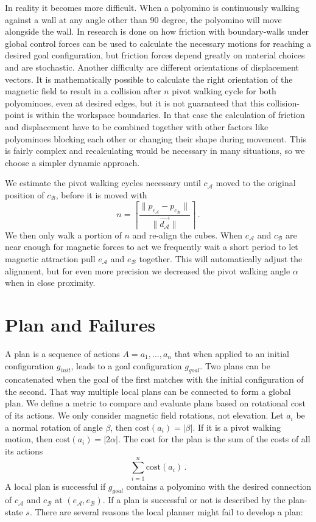 In reality it becomes more difficult.
When a polyomino is continuously walking against a wall at any angle other than 90 degree, the polyomino will move alongside the wall.
In \cite{schmidt2020} research is done on how friction with boundary-walls under global control forces can be used to calculate the necessary motions for reaching a desired goal configuration, but friction forces depend greatly on material choices and are stochastic.
Another difficulty are different orientations of displacement vectors.
It is mathematically possible to calculate the right orientation of the magnetic field to result in a collision after $n$ pivot walking cycle for both polyominoes, even at desired edges, but it is not guaranteed that this collision-point is within the workspace boundaries.
In that case the calculation of friction and displacement have to be combined together with other factors like polyominoes blocking each other or changing their shape during movement.
This is fairly complex and recalculating would be necessary in many situations, so we choose a simpler dynamic approach.

We estimate the pivot walking cycles necessary until $c_\mathcal{A}$ moved to the original position of $c_\mathcal{B}$, before it is moved with
\begin{equation}
n = \left\lceil \frac{\lVert p_{c_\mathcal{A}} - p_{c_\mathcal{B}}\rVert}{\lVert \vec{d_\mathcal{A}} \rVert} \right\rceil \,.
\end{equation}
We then only walk a portion of $n$ and re-align the cubes.
When $c_\mathcal{A}$ and $c_\mathcal{B}$ are near enough for magnetic forces to act we frequently wait a short period to let magnetic attraction pull $e_\mathcal{A}$ and $e_\mathcal{B}$ together.
This will automatically adjust the alignment, but for even more precision we decreased the pivot walking angle $\alpha$ when in close proximity.

\section{Plan and Failures}
\label{sec:plan}

A plan is a sequence of actions $A = a_1, ... , a_n$ that when applied to an initial configuration $g_{init}$, leads to a goal configuration $g_{goal}$.
Two plans can be concatenated when the goal of the first matches with the initial configuration of the second.
That way multiple local plans can be connected to form a global plan.
We define a metric to compare and evaluate plans based on rotational cost of its actions.
We only consider magnetic field rotations, not elevation.
Let $a_i$ be a normal rotation of angle $\beta$, then $\text{cost}(a_i) = |\beta|$.
If it is a pivot walking motion, then $\text{cost}(a_i) = |2\alpha|$.
The cost for the plan is the sum of the costs of all its actions
\begin{equation}
\sum_{i=1}^{n} \text{cost}(a_i) \,.
\end{equation}
A local plan is successful if $g_{goal}$ contains a polyomino with the desired connection of $c_\mathcal{A}$ and $c_\mathcal{B}$ at $(e_\mathcal{A}, e_\mathcal{B})$.
If a plan is successful or not is described by the plan-state $s$.
There are several reasons the local planner might fail to develop a plan:

